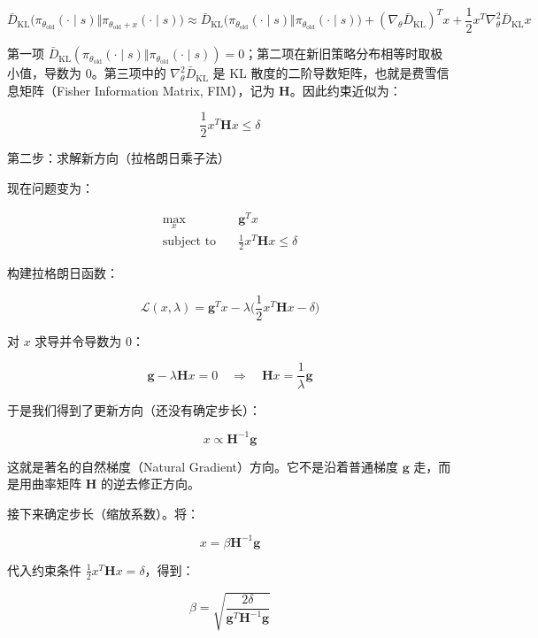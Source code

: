 \[
\bar{D}_{\mathrm{KL}}\bigl(
\pi_{\theta_{\mathrm{old}}}(\cdot\mid s)
\Vert
\pi_{\theta_{\mathrm{old}}+x}(\cdot\mid s)
\bigr)
\approx
\bar{D}_{\mathrm{KL}}\bigl(
\pi_{\theta_{\mathrm{old}}}(\cdot\mid s)
\Vert
\pi_{\theta_{\mathrm{old}}}(\cdot\mid s)
\bigr)
+
(\nabla_\theta \bar{D}_{\mathrm{KL}})^{T} x
+
\frac{1}{2}x^{T}\nabla_\theta^{2}\bar{D}_{\mathrm{KL}}x
\]

第一项 \(\bar{D}_{\mathrm{KL}}(\pi_{\theta_{\mathrm{old}}}(\cdot\mid s)\Vert\pi_{\theta_{\mathrm{old}}}(\cdot\mid s))=0\)；第二项在新旧策略分布相等时取极小值，导数为 \(0\)。第三项中的 \(\nabla_\theta^{2}\bar{D}_{\mathrm{KL}}\) 是 KL 散度的二阶导数矩阵，也就是费雪信息矩阵（Fisher Information Matrix, FIM），记为 \(\mathbf{H}\)。因此约束近似为：

\[
\frac{1}{2}x^{T}\mathbf{H}x\le \delta
\]

第二步：求解新方向（拉格朗日乘子法）

现在问题变为：

\[
\begin{aligned}
\max_x\quad
& \mathbf{g}^{T}x \\
\text{subject to}\quad
& \frac{1}{2}x^{T}\mathbf{H}x\le \delta
\end{aligned}
\]

构建拉格朗日函数：

\[
\mathcal{L}(x,\lambda)=
\mathbf{g}^{T}x
-\lambda
\bigl(
\frac{1}{2}x^{T}\mathbf{H}x-\delta
\bigr)
\]

对 \(x\) 求导并令导数为 \(0\)：

\[
\mathbf{g}-\lambda\mathbf{H}x=0
\quad\Longrightarrow\quad
\mathbf{H}x=\frac{1}{\lambda}\mathbf{g}
\]

于是我们得到了更新方向（还没有确定步长）：

\[
x\propto\mathbf{H}^{-1}\mathbf{g}
\]

这就是著名的自然梯度（Natural Gradient）方向。它不是沿着普通梯度 \(\mathbf{g}\) 走，而是用曲率矩阵 \(\mathbf{H}\) 的逆去修正方向。

接下来确定步长（缩放系数）。将：

\[
x=\beta\mathbf{H}^{-1}\mathbf{g}
\]

代入约束条件 \(\frac{1}{2}x^{T}\mathbf{H}x=\delta\)，得到：

\[
\beta=
\sqrt{
\frac{2\delta}{\mathbf{g}^{T}\mathbf{H}^{-1}\mathbf{g}}
}
\]

